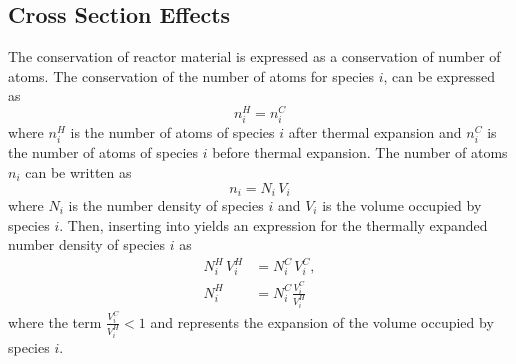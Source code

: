   \subsection{Cross Section Effects}
    \label{sec:cross_section_effects}
    The conservation of reactor material is expressed as a conservation of 
    number of atoms. The conservation of the number of atoms for species $i$, 
    can be expressed as
    \begin{equation}
      \label{eq:conservation}
      n_i^H = n_i^C 
    \end{equation}
    where $n_i^H$ is the number of atoms of species $i$ after thermal expansion
    and $n_i^C$ is the number of atoms of species $i$ before thermal expansion.
    The number of atoms $n_i$ can be written as 
    \begin{equation}
      \label{eq:nden_definition}
      n_i = N_i \, V_i
    \end{equation}
    where $N_i$ is the number density of species $i$ and $V_i$ is the volume
    occupied by species $i$. Then, inserting  into 
     yields an expression for the thermally expanded 
    number density of species $i$ as
    \begin{align}
      N_i^H \, V_i^H &= N_i^C \, V_i^C, \\
      \label{eq:nden_volume_ratio}
      N_i^H &= N_i^C \frac{V_i^C}{V_i^H}
    \end{align}
    where the term $\frac{V_i^C}{V_i^H} < 1$ and represents the expansion of the
    volume occupied by species $i$. 

